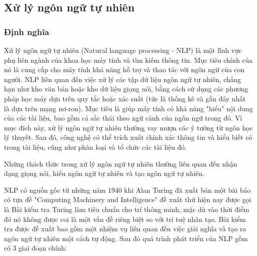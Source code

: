 \subsection{Xử lý ngôn ngữ tự nhiên}
\subsubsection{Định nghĩa}
Xử lý ngôn ngữ tự nhiên (Natural language processing - NLP) là một lĩnh vực phụ liên ngành của khoa học máy tính và tìm kiếm thông tin. Mục tiêu chính của nó là cung cấp cho máy tính khả năng hỗ trợ và thao tác với ngôn ngữ của con người. NLP liên quan đến việc xử lý các tập dữ liệu ngôn ngữ tự nhiên, chẳng hạn như kho văn bản hoặc kho dữ liệu giọng nói, bằng cách sử dụng các phương pháp học máy dựa trên quy tắc hoặc xác suất (tức là thống kê và gần đây nhất là dựa trên mạng nơ-ron). Mục tiêu là giúp máy tính có khả năng "hiểu" nội dung của các tài liệu, bao gồm cả sắc thái theo ngữ cảnh của ngôn ngữ trong đó. Vì mục đích này, xử lý ngôn ngữ tự nhiên thường vay mượn các ý tưởng từ ngôn học lý thuyết. Sau đó, công nghệ có thể trích xuất chính xác thông tin và hiểu biết có trong tài liệu, cũng như phân loại và tổ chức các tài liệu đó.

Những thách thức trong xử lý ngôn ngữ tự nhiên thường liên quan đến nhận dạng giọng nói, hiểu ngôn ngữ tự nhiên và tạo ngôn ngữ tự nhiên.

NLP có nguồn gốc từ những năm 1940 khi Alan Turing đã xuất bản một bài báo có tựa đề "Computing Machinery and Intelligence" đề xuất thứ hiện nay được gọi là Bài kiểm tra Turing làm tiêu chuẩn cho trí thông minh, mặc dù vào thời điểm đó nó không được coi là một vấn đề riêng biệt so với trí tuệ nhân tạo. Bài kiểm tra được đề xuất bao gồm một nhiệm vụ liên quan đến việc giải nghĩa và tạo ra ngôn ngữ tự nhiên một cách tự động. Sau đó quá trình phát triển của NLP gồm có 3 giai đoạn chính:

